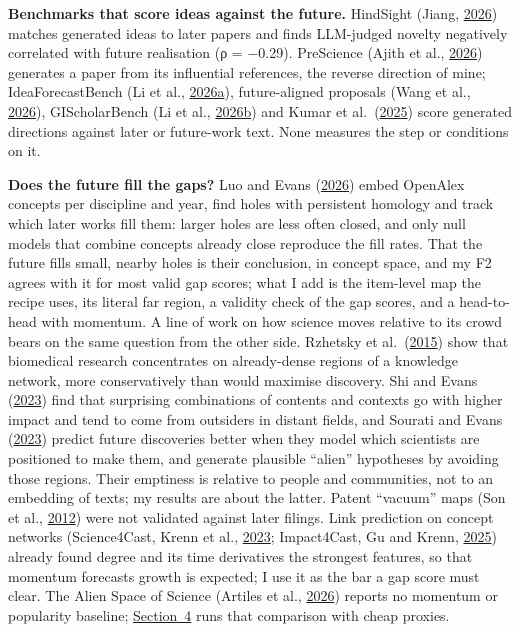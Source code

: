 \documentclass[
  10pt,
]{article}
\begin{document}
\textbf{Benchmarks that score ideas
against the future.} HindSight (Jiang,
\hyperlink{ref-Jiang2026}{2026}) matches
generated ideas to later papers and
finds LLM-judged novelty negatively
correlated with future realisation (ρ =
−0.29). PreScience (Ajith et al.,
\hyperlink{ref-Ajith2026}{2026})
generates a paper from its influential
references, the reverse direction of
mine; IdeaForecastBench (Li et al.,
\hyperlink{ref-Li2026a}{2026a}),
future-aligned proposals (Wang et al.,
\hyperlink{ref-Wang2026}{2026}),
GIScholarBench (Li et al.,
\hyperlink{ref-Li2026b}{2026b}) and
Kumar et
al.~(\hyperlink{ref-Kumar2025}{2025})
score generated directions against later
or future-work text. None measures the
step or conditions on it.

\textbf{Does the future fill the gaps?}
Luo and Evans
(\hyperlink{ref-Luo2026}{2026}) embed
OpenAlex concepts per discipline and
year, find holes with persistent
homology and track which later works
fill them: larger holes are less often
closed, and only null models that
combine concepts already close reproduce
the fill rates. That the future fills
small, nearby holes is their conclusion,
in concept space, and my F2 agrees with
it for most valid gap scores; what I add
is the item-level map the recipe uses,
its literal far region, a validity check
of the gap scores, and a head-to-head
with momentum. A line of work on how
science moves relative to its crowd
bears on the same question from the
other side. Rzhetsky et
al.~(\hyperlink{ref-Rzhetsky2015}{2015})
show that biomedical research
concentrates on already-dense regions of
a knowledge network, more conservatively
than would maximise discovery. Shi and
Evans (\hyperlink{ref-Shi2023}{2023})
find that surprising combinations of
contents and contexts go with higher
impact and tend to come from outsiders
in distant fields, and Sourati and Evans
(\hyperlink{ref-Sourati2023}{2023})
predict future discoveries better when
they model which scientists are
positioned to make them, and generate
plausible ``alien'' hypotheses by
avoiding those regions. Their emptiness
is relative to people and communities,
not to an embedding of texts; my results
are about the latter. Patent ``vacuum''
maps (Son et al.,
\hyperlink{ref-Son2012}{2012}) were not
validated against later filings. Link
prediction on concept networks
(Science4Cast, Krenn et al.,
\hyperlink{ref-Krenn2023}{2023};
Impact4Cast, Gu and Krenn,
\hyperlink{ref-Gu2025}{2025}) already
found degree and its time derivatives
the strongest features, so that momentum
forecasts growth is expected; I use it
as the bar a gap score must clear. The
Alien Space of Science (Artiles et al.,
\hyperlink{ref-Artiles2026}{2026})
reports no momentum or popularity
baseline; \hyperref[sec:4]{Section~4}
runs that comparison with cheap proxies.
\end{document}
